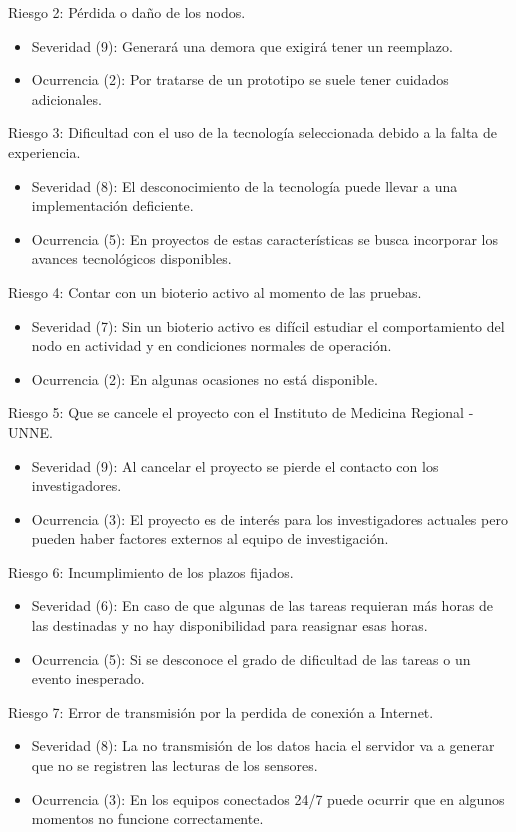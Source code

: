 \documentclass[
11pt, %
]{charter}
\begin{document}
Riesgo 2: Pérdida o daño de los nodos.
\begin{itemize}
	\item Severidad (9): Generará una demora  que exigirá tener un reemplazo.
	\item Ocurrencia (2): Por tratarse de un prototipo se suele tener cuidados adicionales.
\end{itemize}

Riesgo 3: Dificultad con el uso de la tecnología seleccionada debido a la falta de experiencia.
\begin{itemize}
	\item Severidad (8): El desconocimiento de la tecnología puede llevar a una implementación deficiente.
	\item Ocurrencia (5): En proyectos de estas características se busca incorporar los avances tecnológicos disponibles.
\end{itemize}

Riesgo 4: Contar con un bioterio activo al momento de las pruebas.
\begin{itemize}
	\item Severidad (7): Sin un bioterio activo es difícil estudiar el comportamiento del nodo en actividad y en condiciones normales de operación.
	\item Ocurrencia (2): En algunas ocasiones no está disponible.
\end{itemize}

Riesgo 5: Que se cancele el proyecto con el Instituto de Medicina Regional - UNNE.
\begin{itemize}
	\item Severidad (9): Al cancelar el proyecto se pierde el contacto con los investigadores.
	\item Ocurrencia (3): El proyecto es de interés para los investigadores actuales pero pueden haber factores externos al equipo de investigación.
\end{itemize}

Riesgo 6: Incumplimiento de los plazos fijados.
\begin{itemize}
	\item Severidad (6): En caso de que algunas de las tareas requieran más horas de las destinadas y no hay disponibilidad para reasignar esas horas.
	\item Ocurrencia (5): Si se desconoce el grado de dificultad de las tareas o un evento inesperado.
\end{itemize}

Riesgo 7: Error de transmisión por la perdida de conexión a Internet.
\begin{itemize}
	\item Severidad (8): La no transmisión de los datos hacia el servidor va a generar que no se registren las lecturas de los sensores.
	\item Ocurrencia (3): En los equipos conectados 24/7 puede ocurrir que en algunos momentos no funcione correctamente.
\end{itemize}
\end{document}
